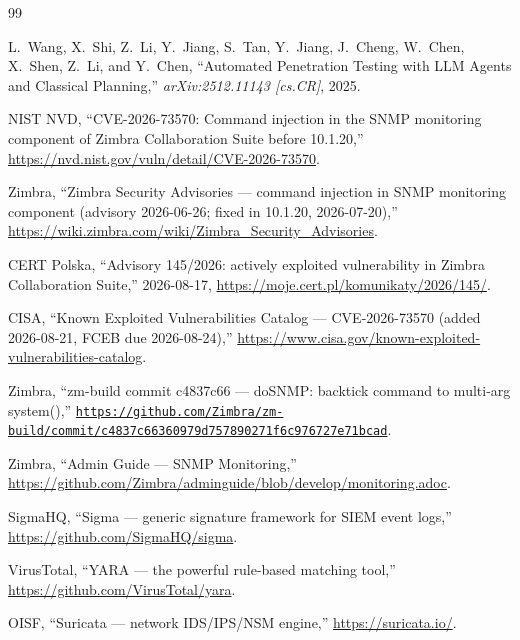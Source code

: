\documentclass[journal]{IEEEtran}
\begin{document}
\begin{thebibliography}{99}

L.~Wang, X.~Shi, Z.~Li, Y.~Jiang, S.~Tan, Y.~Jiang, J.~Cheng, W.~Chen,
X.~Shen, Z.~Li, and Y.~Chen, ``Automated Penetration Testing with LLM Agents
and Classical Planning,'' \emph{arXiv:2512.11143 [cs.CR]}, 2025.

NIST NVD, ``CVE-2026-73570: Command injection in the SNMP monitoring
component of Zimbra Collaboration Suite before 10.1.20,''
\url{https://nvd.nist.gov/vuln/detail/CVE-2026-73570}.

Zimbra, ``Zimbra Security Advisories — command injection in SNMP
monitoring component (advisory 2026-06-26; fixed in 10.1.20, 2026-07-20),''
\url{https://wiki.zimbra.com/wiki/Zimbra_Security_Advisories}.

CERT Polska, ``Advisory 145/2026: actively exploited vulnerability in
Zimbra Collaboration Suite,'' 2026-08-17,
\url{https://moje.cert.pl/komunikaty/2026/145/}.

CISA, ``Known Exploited Vulnerabilities Catalog — CVE-2026-73570
(added 2026-08-21, FCEB due 2026-08-24),''
\url{https://www.cisa.gov/known-exploited-vulnerabilities-catalog}.

Zimbra, ``zm-build commit c4837c66 —
doSNMP: backtick command to multi-arg system(),''
\href{https://github.com/Zimbra/zm-build/commit/c4837c66360979d757890271f6c976727e71bcad}{\texttt{https://github.com/Zimbra/zm-build/commit/\hspace{0pt}c4837c663609\hspace{0pt}79d757890271\hspace{0pt}f6c976727e71bcad}}.

Zimbra, ``Admin Guide — SNMP Monitoring,''
\url{https://github.com/Zimbra/adminguide/blob/develop/monitoring.adoc}.

SigmaHQ, ``Sigma — generic signature framework for SIEM event logs,''
\url{https://github.com/SigmaHQ/sigma}.

VirusTotal, ``YARA — the powerful rule-based matching tool,''
\url{https://github.com/VirusTotal/yara}.

OISF, ``Suricata — network IDS/IPS/NSM engine,''
\url{https://suricata.io/}.

\end{thebibliography}
\end{document}
